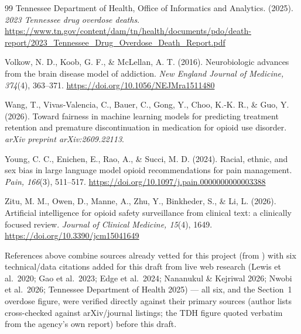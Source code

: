 \documentclass[11pt]{article}
\begin{document}
\begin{thebibliography}{99}
 Tennessee Department of Health, Office of Informatics and Analytics. (2025). \emph{2023 Tennessee drug overdose deaths}. \url{https://www.tn.gov/content/dam/tn/health/documents/pdo/death-report/2023_Tennessee_Drug_Overdose_Death_Report.pdf}

 Volkow, N. D., Koob, G. F., \& McLellan, A. T. (2016). Neurobiologic advances from the brain disease model of addiction. \emph{New England Journal of Medicine, 374}(4), 363--371. \url{https://doi.org/10.1056/NEJMra1511480}

 Wang, T., Vivas-Valencia, C., Bauer, C., Gong, Y., Choo, K.-K. R., \& Guo, Y. (2026). Toward fairness in machine learning models for predicting treatment retention and premature discontinuation in medication for opioid use disorder. \emph{arXiv preprint arXiv:2609.22113}.

 Young, C. C., Enichen, E., Rao, A., \& Succi, M. D. (2024). Racial, ethnic, and sex bias in large language model opioid recommendations for pain management. \emph{Pain, 166}(3), 511--517. \url{https://doi.org/10.1097/j.pain.0000000000003388}

 Zitu, M. M., Owen, D., Manne, A., Zhu, Y., Binkheder, S., \& Li, L. (2026). Artificial intelligence for opioid safety surveillance from clinical text: a clinically focused review. \emph{Journal of Clinical Medicine, 15}(4), 1649. \url{https://doi.org/10.3390/jcm15041649}

\end{thebibliography}

References above combine sources already vetted for this project (from ) with six technical/data citations added for this draft from live web research (Lewis et al.\ 2020; Gao et al.\ 2023; Edge et al.\ 2024; Nananukul \& Kejriwal 2026; Nwobi et al.\ 2026; Tennessee Department of Health 2025) --- all six, and the Section~1 overdose figure, were verified directly against their primary sources (author lists cross-checked against arXiv/journal listings; the TDH figure quoted verbatim from the agency's own report) before this draft.

\appendix
\end{document}
